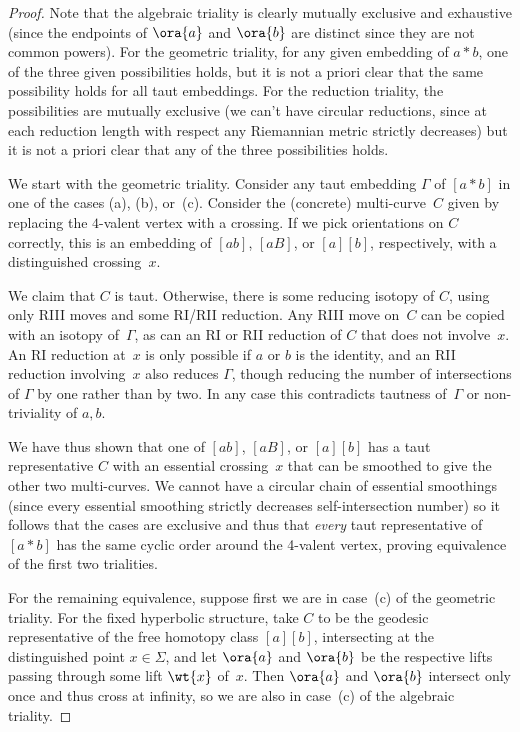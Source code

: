 \begin{proof}
  Note that the algebraic triality is clearly mutually exclusive and
  exhaustive (since the endpoints of $\ora{a}$ and $\ora{b}$ are
  distinct since they are not common powers). For the geometric triality,
  for any given embedding of $a * b$, one of the three given
  possibilities holds, but it is not a priori clear that the same
  possibility holds for all taut embeddings. For the reduction triality,
  the possibilities are mutually exclusive (we can't have circular
  reductions, since at each reduction length with respect any
  Riemannian metric strictly decreases) but it is not a priori clear
  that any of the three possibilities holds.
  
  We start with the geometric triality. Consider any taut embedding
  $\Gamma$ of $[a * b]$ in one of the cases (a), (b), or~(c). Consider
  the (concrete) multi-curve~$C$ given by replacing the
  $4$-valent vertex with a crossing. If we pick orientations on $C$
  correctly, this is an embedding of $[ab]$, $[aB]$, or $[a][b]$,
  respectively, with a distinguished crossing~$x$.

  We claim that $C$ is taut. Otherwise, there is some reducing isotopy
  of $C$, using only RIII moves and some RI/RII reduction. Any RIII move on~$C$
  can be copied with an isotopy of~$\Gamma$, as can an RI or RII reduction of
  $C$ that does not involve~$x$. An RI
  reduction at~$x$ is only possible if $a$ or $b$ is the identity, and
  an RII reduction involving~$x$ also reduces $\Gamma$, though
  reducing the number of intersections of $\Gamma$ by one rather than
  by two. In any case this contradicts tautness of~$\Gamma$ or
  non-triviality of $a,b$.

  We have thus shown that one of $[ab]$, $[aB]$, or $[a][b]$ has a
  taut representative $C$ with an essential crossing~$x$ that can be
  smoothed to give the other two multi-curves. We cannot have a
  circular chain of essential smoothings (since every essential
  smoothing strictly decreases self-intersection number) so it follows
  that the cases are exclusive and thus that \emph{every} taut
  representative of $[a * b]$ has the same cyclic order around the
  4-valent vertex, proving equivalence of the first two trialities.

  For the remaining equivalence, suppose first we
  are in case~(c) of the geometric triality. For the fixed hyperbolic
  structure, take $C$ to be the geodesic representative of the free
  homotopy class $[a][b]$, intersecting at the distinguished point
  $x \in \Sigma$, and let $\ora{a}$ and $\ora{b}$ be the respective
  lifts passing through some lift $\wt{x}$ of~$x$. Then $\ora{a}$ and
  $\ora{b}$ intersect only once and thus cross at infinity, so we are
  also in case~(c) of the algebraic triality.


\end{proof}

